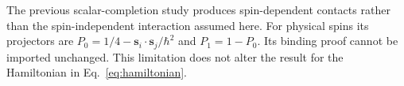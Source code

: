 The previous scalar-completion study produces spin-dependent contacts rather than the spin-independent interaction assumed here. For physical spins its projectors are
$P_0=1/4-\mathbf s_i\cdot\mathbf s_j/\hbar^2$ and $P_1=1-P_0$.
Its binding proof cannot be imported unchanged. This limitation does not alter the result for the Hamiltonian in Eq.~\eqref{eq:hamiltonian}.
